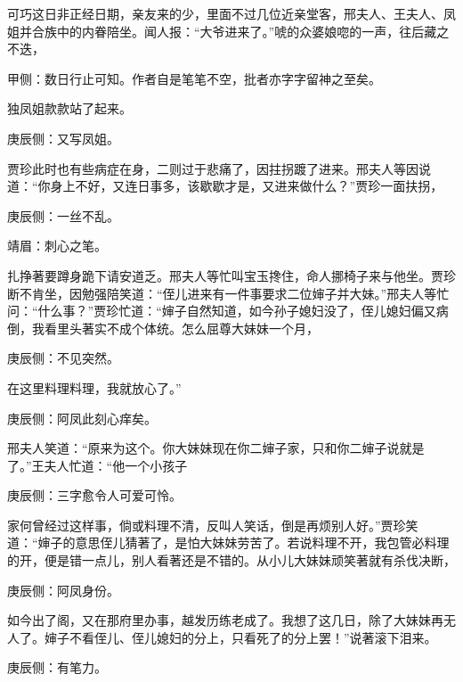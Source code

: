 \begin{parag}
    可巧这日非正经日期，亲友来的少，里面不过几位近亲堂客，邢夫人、王夫人、凤姐并合族中的内眷陪坐。闻人报：“大爷进来了。”唬的众婆娘唿的一声，往后藏之不迭，\begin{note}甲侧：数日行止可知。作者自是笔笔不空，批者亦字字留神之至矣。\end{note}独凤姐款款站了起来。\begin{note}庚辰侧：又写凤姐。\end{note}贾珍此时也有些病症在身，二则过于悲痛了，因拄拐踱了进来。邢夫人等因说道：“你身上不好，又连日事多，该歇歇才是，又进来做什么？”贾珍一面扶拐，\begin{note}庚辰侧：一丝不乱。\end{note}\begin{note}靖眉：刺心之笔。\end{note}扎挣著要蹲身跪下请安道乏。邢夫人等忙叫宝玉搀住，命人挪椅子来与他坐。贾珍断不肯坐，因勉强陪笑道：“侄儿进来有一件事要求二位婶子并大妹。”邢夫人等忙问：“什么事？”贾珍忙道：“婶子自然知道，如今孙子媳妇没了，侄儿媳妇偏又病倒，我看里头著实不成个体统。怎么屈尊大妹妹一个月，\begin{note}庚辰侧：不见突然。\end{note}在这里料理料理，我就放心了。”\begin{note}庚辰侧：阿凤此刻心痒矣。\end{note}邢夫人笑道：“原来为这个。你大妹妹现在你二婶子家，只和你二婶子说就是了。”王夫人忙道：“他一个小孩子\begin{note}庚辰侧：三字愈令人可爱可怜。\end{note}家何曾经过这样事，倘或料理不清，反叫人笑话，倒是再烦别人好。”贾珍笑道：“婶子的意思侄儿猜著了，是怕大妹妹劳苦了。若说料理不开，我包管必料理的开，便是错一点儿，别人看著还是不错的。从小儿大妹妹顽笑著就有杀伐决断，\begin{note}庚辰侧：阿凤身份。\end{note}如今出了阁，又在那府里办事，越发历练老成了。我想了这几日，除了大妹妹再无人了。婶子不看侄儿、侄儿媳妇的分上，只看死了的分上罢！”说著滚下泪来。\begin{note}庚辰侧：有笔力。\end{note}
\end{parag}


